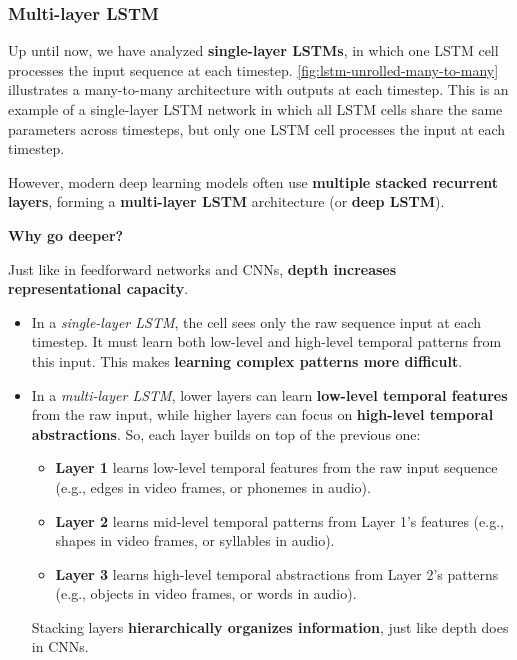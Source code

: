 \subsubsection{Multi-layer LSTM}

Up until now, we have analyzed \textbf{single-layer LSTMs}, in which one LSTM cell processes the input sequence at each timestep. \autoref{fig:lstm-unrolled-many-to-many} illustrates a many-to-many architecture with outputs at each timestep. This is an example of a single-layer LSTM network in which all LSTM cells share the same parameters across timesteps, but only one LSTM cell processes the input at each timestep.

\highspace
However, modern deep learning models often use \textbf{multiple stacked recurrent layers}, forming a \textbf{multi-layer LSTM} architecture (or \textbf{deep LSTM}).

\highspace
\begin{flushleft}
    \textcolor{Green3}{ \textbf{Why go deeper?}}
\end{flushleft}
Just like in feedforward networks and CNNs, \textbf{depth increases representational capacity}.
\begin{itemize}
    \item[\textcolor{Red2}{\faIcon{times}}] In a \emph{single-layer LSTM}, the cell sees only the raw sequence input at each timestep. It must learn both low-level and high-level temporal patterns from this input. This makes \textbf{learning complex patterns more difficult}.
    \item[\textcolor{Green3}{\faIcon{check}}] In a \emph{multi-layer LSTM}, lower layers can learn \textbf{low-level temporal features} from the raw input, while higher layers can focus on \textbf{high-level temporal abstractions}. So, each layer builds on top of the previous one:
    \begin{itemize}
        \item \textbf{Layer 1} learns low-level temporal features from the raw input sequence (e.g., edges in video frames, or phonemes in audio).
        \item \textbf{Layer 2} learns mid-level temporal patterns from Layer 1's features (e.g., shapes in video frames, or syllables in audio).
        \item \textbf{Layer 3} learns high-level temporal abstractions from Layer 2's patterns (e.g., objects in video frames, or words in audio).
    \end{itemize}
    Stacking layers \textbf{hierarchically organizes information}, just like depth does in CNNs.
\end{itemize}

